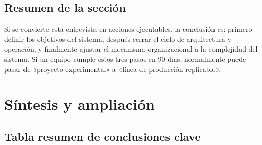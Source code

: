 \documentclass[a4paper]{article}
\begin{document}
\subsection{Resumen de la sección}

Si se convierte esta entrevista en acciones ejecutables, la conclusión es: primero definir los objetivos del sistema, después cerrar el ciclo de arquitectura y operación, y finalmente ajustar el mecanismo organizacional a la complejidad del sistema. Si un equipo cumple estos tres pasos en 90 días, normalmente puede pasar de «proyecto experimental» a «línea de producción replicable».
\section{Síntesis y ampliación}

\subsection{Tabla resumen de conclusiones clave}
\end{document}
